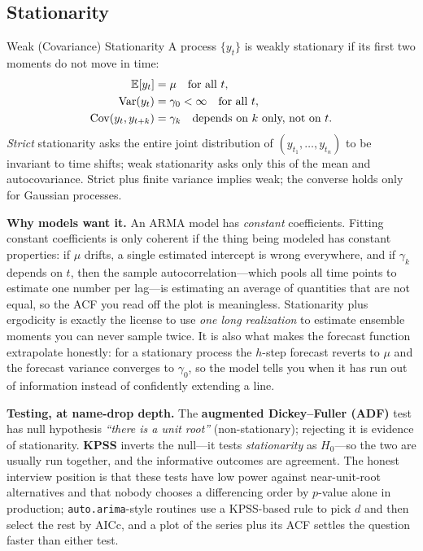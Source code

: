 \subsection{Stationarity}

\begin{mathresult}{Weak (Covariance) Stationarity}
A process $\{y_t\}$ is weakly stationary if its first two moments do not move in time:
\begin{align}
\operatorname{\mathbb{E}}[y_t] &= \mu \quad \text{for all } t, \\
\operatorname{Var}(y_t) &= \gamma_0 < \infty \quad \text{for all } t, \\
\operatorname{Cov}(y_t, y_{t+k}) &= \gamma_k \quad \text{depends on } k \text{ only, not on } t.
\end{align}
\emph{Strict} stationarity asks the entire joint distribution of $(y_{t_1},\ldots,y_{t_n})$ to be invariant to time shifts; weak stationarity asks only this of the mean and autocovariance. Strict plus finite variance implies weak; the converse holds only for Gaussian processes.
\end{mathresult}

\textbf{Why models want it.} An ARMA model has \emph{constant} coefficients. Fitting constant coefficients is only coherent if the thing being modeled has constant properties: if $\mu$ drifts, a single estimated intercept is wrong everywhere, and if $\gamma_k$ depends on $t$, then the sample autocorrelation---which pools all time points to estimate one number per lag---is estimating an average of quantities that are not equal, so the ACF you read off the plot is meaningless. Stationarity plus ergodicity is exactly the license to use \emph{one long realization} to estimate ensemble moments you can never sample twice. It is also what makes the forecast function extrapolate honestly: for a stationary process the $h$-step forecast reverts to $\mu$ and the forecast variance converges to $\gamma_0$, so the model tells you when it has run out of information instead of confidently extending a line.

\textbf{Testing, at name-drop depth.} The \textbf{augmented Dickey--Fuller (ADF)} test has null hypothesis \emph{``there is a unit root''} (non-stationary); rejecting it is evidence of stationarity. \textbf{KPSS} inverts the null---it tests \emph{stationarity} as $H_0$---so the two are usually run together, and the informative outcomes are agreement. The honest interview position is that these tests have low power against near-unit-root alternatives and that nobody chooses a differencing order by $p$-value alone in production; \texttt{auto.arima}-style routines use a KPSS-based rule to pick $d$ and then select the rest by AICc, and a plot of the series plus its ACF settles the question faster than either test.

